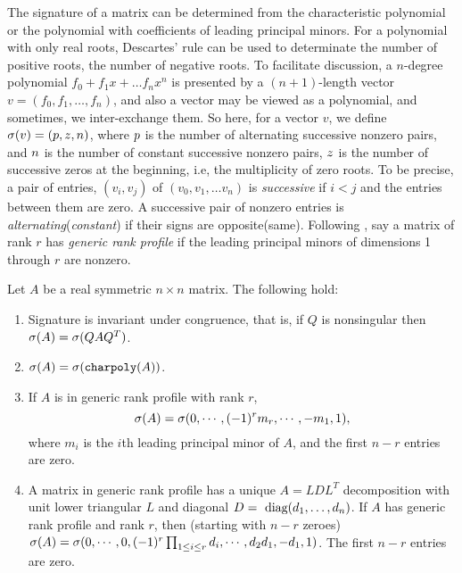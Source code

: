 \documentclass{acm_proc_article-sp}
\begin{document}
The signature of a matrix can be determined from
the characteristic polynomial or
the polynomial with coefficients of leading principal minors.
For a polynomial with only real roots, Descartes' rule can be used to 
determinate the number of positive roots, the number of negative roots.
To facilitate discussion,
a $n$-degree polynomial $f_0 + f_1 x + \ldots f_n x^n$ is presented by
a $(n+1)$-length vector $v = (f_0, f_1, \ldots, f_n)$, and also a vector
may be viewed as a polynomial, and sometimes, we inter-exchange them.
So here, for a vector $v$, we define 
$\sigma(v) = (p, z, n)$, where
$p$ is the number of alternating successive nonzero pairs, and 
$n$ is the number of constant successive nonzero pairs,
$z$ is the number of successive zeros at the beginning,
i.e, the multiplicity of zero roots.
To be precise, %
a pair of entries, $(v_i, v_j)$ of $(v_0, v_1, \ldots v_n)$ is {\em successive} 
if $i < j$ and the entries between them are zero.
A successive pair of nonzero entries is {\em alternating}({\em constant}) if 
their signs are opposite(same).
Following \cite{KaLo96:issac},
say a matrix of rank $r$ has 
{\em generic rank profile} if the leading principal minors 
of dimensions 1 through $r$ are nonzero. 

\begin{theorem} {\label{theorem:sig}}
Let $A$ be a real symmetric $n\times n$ matrix.
The following hold:
\begin{enumerate}
\item 
Signature is invariant under congruence, that is, if 
$Q$ is nonsingular then $\sigma(A) = \sigma(QAQ^T)$.
\item
$\sigma(A) = \sigma(\mbox{\tt charpoly}(A))$.\\
\item
If $A$ is in generic rank profile with rank $r$, 
$$\sigma(A) = \sigma(0, \cdots, (-1)^r m_r, \cdots, -m_1, 1),$$
where $m_i$ is the $i$th leading principal minor of $A$, and the first $n-r$
entries are zero.
\item
A matrix in generic rank profile has a unique $A = LDL^T$ decomposition with 
unit lower triangular $L$ and diagonal $D = \mbox{ diag}(d_1, \ldots, d_n)$.  If $A$
has generic rank profile and rank $r$, then (starting with $n-r$ zeroes)\\
$\sigma(A) = \sigma(0, \cdots, 0, (-1)^r\prod_{1 \leq i \leq r}d_i, 
\cdots, d_2 d_1, -d_1, 1)$. The first $n-r$ entries are zero.
\end{enumerate}
\end{theorem}
\end{document}

